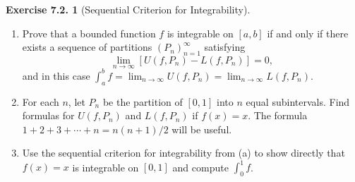 \documentclass[12pt]{article}
\theoremstyle{definition}
\theoremstyle{exercise}
\newtheorem{exercise}{Exercise 7.2.}
\theoremstyle{solution}
\begin{document}
\begin{exercise}[Sequential Criterion for Integrability]
\label{ex:3}
    \begin{enumerate}
        \item Prove that a bounded function \( f \) is integrable on \( [a, b] \) if and only if there exists a sequence of partitions \( (P_n)_{n=1}^{\infty} \) satisfying
        \[
            \lim_{n \to \infty} [U(f, P_n) - L(f, P_n)] = 0,
        \]
        and in this case \( \int_a^b f = \lim_{n \to \infty} U(f, P_n) = \lim_{n \to \infty} L(f, P_n) \).

        \item For each \( n \), let \( P_n \) be the partition of \( [0, 1] \) into \( n \) equal subintervals. Find formulas for \( U(f, P_n) \) and \( L(f, P_n) \) if \( f(x) = x \). The formula \( 1 + 2 + 3 + \cdots + n = n(n+1)/2 \) will be useful.

        \item Use the sequential criterion for integrability from (a) to show directly that \( f(x) = x \) is integrable on \( [0, 1] \) and compute \( \int_0^1 f \).
    \end{enumerate}
\end{exercise}
\end{document}
